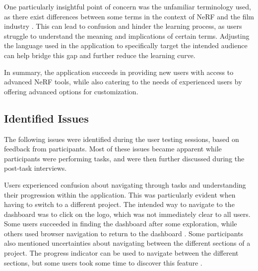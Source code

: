 
One particularly insightful point of concern was the unfamiliar terminology used, as there exist differences between some terms in the context of NeRF and the film industry \cite{P5}. 
This can lead to confusion and hinder the learning process, as users struggle to understand the meaning and implications of certain terms.
Adjusting the language used in the application to specifically target the intended audience can help bridge this gap and further reduce the learning curve.


In summary, the application succeeds in providing new users with access to advanced NeRF tools, while also catering to the needs of experienced users by offering advanced options for customization.

\subsection*{Identified Issues}
\label{sec:results:issues}

The following issues were identified during the user testing sessions, based on feedback from participants. 
Most of these issues became apparent while participants were performing tasks, and were then further discussed during the post-task interviews.

Users experienced confusion about navigating through tasks and understanding their progression within the application.
This was particularly evident when having to switch to a different project.
The intended way to navigate to the dashboard was to click on the logo, which was not immediately clear to all users.
Some users succeeded in finding the dashboard after some exploration, while others used browser navigation to return to the dashboard \cite{P1, P4, P5, P6, P8, P10}.
Some participants also mentioned uncertainties about navigating between the different sections of a project.
The progress indicator can be used to navigate between the different sections, but some users took some time to discover this feature \cite{P9}.

